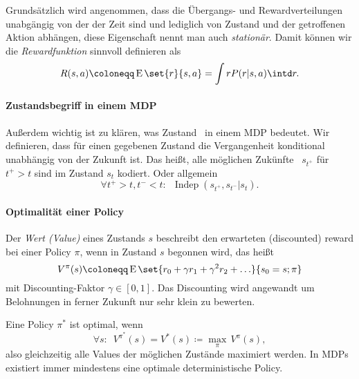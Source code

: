 \documentclass[ngerman]{../LaTeX-Templates/Paper/paper}
\newcommand{\E}{\ensuremath{\operatorname{E}}}
\newcommand{\independent}{\ensuremath{\operatorname{Indep}}}
\newcommand{\enqo}[1]{\glqq #1\grqq\ }
\begin{document}
Grundsätzlich wird angenommen, dass die Übergangs- und Rewardverteilungen unabgängig von der der Zeit sind und lediglich von Zustand und der getroffenen Aktion abhängen, diese Eigenschaft nennt man auch \emph{stationär}. 
Damit können wir die \emph{Rewardfunktion} sinnvoll definieren als
\begin{equation}\label{rewardfunction}
	R(s,a)\coloneqq\E\set{r}{s,a}=\int rP(r|s,a)\intd r.
\end{equation}

\paragraph{Zustandsbegriff in einem MDP}
Außerdem wichtig ist zu klären, was \enqo{Zustand} in einem MDP bedeutet. Wir definieren, dass für einen gegebenen Zustand die Vergangenheit konditional unabhängig von der Zukunft ist. Das heißt, alle möglichen \enqo{Zukünfte} $s_{t^+}$ für $t^+>t$ sind im Zustand $s_t$ kodiert. Oder allgemein
\begin{equation*}
	\forall t^+>t,t^-<t:\enspace\independent(s_{t^+},s_{t^-}|s_t).	
\end{equation*} 

\paragraph{Optimalität einer Policy}
Der \emph{Wert (Value)} eines Zustands $s$ beschreibt den erwarteten (discounted) reward bei einer Policy $\pi$, wenn in Zustand $s$ begonnen wird, das heißt
\begin{equation*}
 	V^\pi(s)\coloneqq\E\set{r_0+\gamma r_1+\gamma^2r_2+\ldots}{s_0=s;\pi}
 \end{equation*} 
mit Discounting-Faktor $\gamma\in[0,1]$. Das Discounting wird angewandt um Belohnungen in ferner Zukunft nur sehr klein zu bewerten.

Eine Policy $\pi^\ast$ ist optimal, wenn
\begin{equation*}
	\forall s:\enspace V^{\pi^\ast}(s)=V^\ast(s)\coloneqq\underset\pi\max\, V^\pi(s),
\end{equation*}
also gleichzeitig alle Values der möglichen Zustände maximiert werden.
In MDPs existiert immer mindestens eine optimale deterministische Policy.
\end{document}
